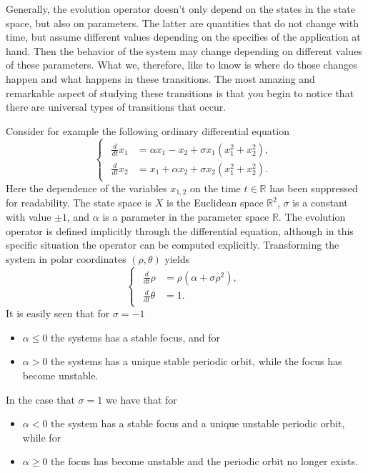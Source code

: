 Generally, the evolution operator doesn't only depend on the states in the
state space, but also on parameters. The latter are quantities that do not
change with time, but assume different values depending on the specifies of the
application at hand. Then the behavior of the system may change depending on
different values of these parameters. What we, therefore, like to know is where
do those changes happen and what happens in these transitions. The most amazing
and remarkable aspect of studying these transitions is that you begin to notice
that there are universal types of transitions that occur.

Consider for example the following ordinary differential equation
\[
    \begin{cases}
    \begin{aligned}
        \frac{d}{dt} x_1 &= \alpha x_1  - x_2 + \sigma x_1(x_1^2 + x_2^2), \\
        \frac{d}{dt} x_2 &= x_1 + \alpha  x_2 + \sigma x_2(x_1^2 + x_2^2).
    \end{aligned}
    \end{cases}
\]
Here the dependence of the variables $x_{1,2}$ on the time $t\in \mathbb R$ has
been suppressed for readability. The state space is $X$ is the Euclidean space
$\mathbb R^2$, $\sigma$ is a constant with value $\pm 1$, and $\alpha$ is a
parameter in the parameter space $\mathbb R$. The evolution operator is defined
implicitly through the differential equation, although in this specific situation
the operator can be computed explicitly. Transforming the system in polar
coordinates $(\rho, \theta)$ yields
\[
    \begin{cases}
    \begin{aligned}
        \frac{d}{dt} \rho &= \rho(\alpha + \sigma \rho^2), \\
        \frac{d}{dt} \theta &= 1.
    \end{aligned}
    \end{cases}
\]
It is easily seen that for $\sigma=-1$
\begin{itemize}
    \item $\alpha \leq 0$ the systems has a stable focus, and for 
    \item $\alpha > 0$ the systems has a unique stable periodic orbit,
        while the focus has become unstable.
\end{itemize}
In the case that $\sigma=1$ we have that for
\begin{itemize}
    \item $\alpha < 0$ the system has a stable focus and a unique unstable
        periodic orbit, while for
    \item $\alpha \geq 0$ the focus has become
        unstable and the periodic orbit no longer exists.
\end{itemize}
